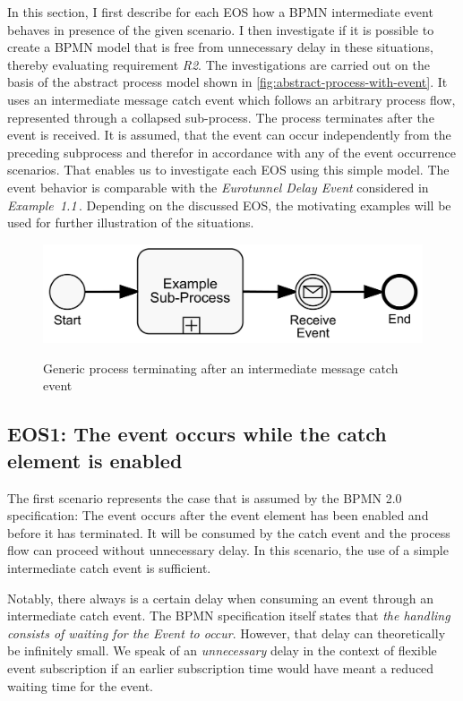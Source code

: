 In this section, I first describe for each \ac{EOS} how a BPMN intermediate event behaves in presence of the given scenario.
I then investigate if it is possible to create a BPMN model that is free from unnecessary delay in these situations, thereby evaluating requirement \textit{R2}.
The investigations are carried out on the basis of the abstract process model shown in \autoref{fig:abstract-process-with-event}.
It uses an intermediate message catch event which follows an arbitrary process flow, represented through a collapsed sub-process.
The process terminates after the event is received.
It is assumed, that the event can occur independently from the preceding subprocess and therefor in accordance with any of the event occurrence scenarios. That enables us to investigate each EOS using this simple model.
The event behavior is comparable with the \textit{Eurotunnel Delay Event} considered in \textit{Example~1.1}\,. Depending on the discussed EOS, the motivating examples will be used for further illustration of the situations.

\begin{figure}[]
	\myfloatalign
	{\includegraphics[width=0.7\linewidth]{chapters/assessment/generic-process-with-interm-event.png}}
	\caption{Generic process terminating after an intermediate message catch event}\label{fig:abstract-process-with-event}
\end{figure}


\subsection*{EOS1: The event occurs while the catch element is enabled}

The first scenario represents the case that is assumed by the BPMN 2.0 specification: 
The event occurs after the event element has been enabled and before it has terminated. It will be consumed by the catch event and the process flow can proceed without unnecessary delay.
In this scenario, the use of a simple intermediate catch event is sufficient.

Notably, there always is a certain delay when consuming an event through an intermediate catch event. The BPMN specification itself states that \textit{the handling consists of waiting for the Event to occur}.
However, that delay can theoretically be infinitely small. 
We speak of an \textit{unnecessary} delay in the context of flexible event subscription if an earlier subscription time would have meant a reduced waiting time for the event.


